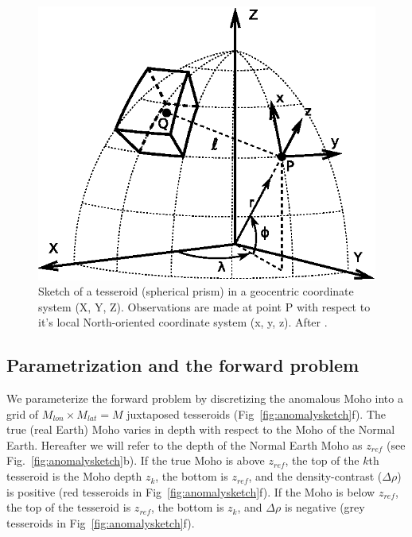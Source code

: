 \documentclass[extra,mreferee]{gji}
\begin{document}
\begin{figure}
    \centering
    \includegraphics{figures/tesseroid-coord-sys}
    \caption{Sketch of a tesseroid (spherical prism) in a geocentric coordinate
        system (X, Y, Z).
        Observations are made at point P with respect to it's local
        North-oriented coordinate system (x, y, z).
        After \citet{uieda2015}.
    }
    \label{fig:tesseroid}
\end{figure}


\subsection{Parametrization and the forward problem}

We parameterize the forward problem by discretizing the anomalous Moho
into a grid of $M_{lon} \times M_{lat} = M$ juxtaposed tesseroids
(Fig~\ref{fig:anomalysketch}f).
The true (real Earth) Moho varies in depth
with respect to the Moho of the Normal Earth.
Hereafter we will refer to the depth of the Normal Earth Moho as $z_{ref}$
(see Fig.~\ref{fig:anomalysketch}b).
If the true Moho is above $z_{ref}$,
the top of the $k$th tesseroid is the Moho depth $z_{k}$,
the bottom is $z_{ref}$, and the density-contrast ($\Delta\rho$) is positive
(red tesseroids in Fig~\ref{fig:anomalysketch}f).
If the Moho is below $z_{ref}$, the top of the tesseroid is $z_{ref}$,
the bottom is $z_k$, and $\Delta\rho$ is negative
(grey tesseroids in Fig~\ref{fig:anomalysketch}f).
\end{document}
